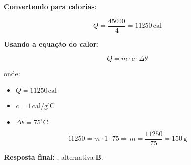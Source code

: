 \documentclass[a4paper,12pt]{article}
\begin{document}
\begin{flushleft}
\textbf{Convertendo para calorias:}

\[
Q = \frac{45000}{4} = 11250\,\text{cal}
\]

\textbf{Usando a equação do calor:}

\[
Q = m \cdot c \cdot \Delta \theta
\]

onde:

\begin{itemize}
    \item $Q = 11250\,\text{cal}$
    \item $c = 1\,\text{cal/g}^\circ\text{C}$
    \item $\Delta \theta = 75^\circ\text{C}$
\end{itemize}

\[
11250 = m \cdot 1 \cdot 75 \Rightarrow m = \frac{11250}{75} = \boxed{150\,\text{g}}
\]

\vspace{0.3cm}
\textbf{Resposta final:} , alternativa \colorbox{green!50}{\textbf{B}}.

\end{flushleft}
\end{document}
